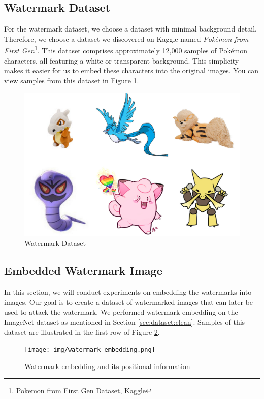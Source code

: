 \subsection{Watermark Dataset}
\label{sec:dataset:wtm}
For the watermark dataset, we choose a dataset with minimal background detail. Therefore, we choose a dataset we discovered on Kaggle named \textit{Pokémon from First Gen}\footnote{\href{https://www.kaggle.com/datasets/unexpectedscepticism/11945-pokemon-from-first-gen}{Pokemon from First Gen Dataset, Kaggle}}. This dataset comprises approximately 12,000 samples of Pokémon characters, all featuring a white or transparent background. This simplicity makes it easier for us to embed these characters into the original images. You can view samples from this dataset in Figure \ref{fig:Pokemon}.

\begin{figure}[t]
    \centering
    \includegraphics[width = 0.5 \textwidth]{img/Pokemon.png}
    \caption{Watermark Dataset}
    \label{fig:Pokemon}
\end{figure}

\subsection{Embedded Watermark Image}
\label{sec:ewi}
\label{sec:embedding}
In this section, we will conduct experiments on embedding the watermarks into images. Our goal is to create a dataset of watermarked images that can later be used to attack the watermark. We performed watermark embedding on the ImageNet dataset as mentioned in Section \ref{sec:dataset:clean}. Samples of this dataset are illustrated in the first row of Figure \ref{fig:watermark-embedding}.

\begin{figure}[t]
    \centering
    \texttt{[image: img/watermark-embedding.png]}
    \caption{Watermark embedding and its positional information}
    \label{fig:watermark-embedding}
\end{figure}

